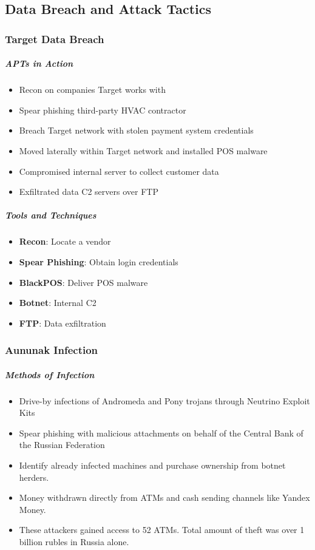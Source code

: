 \subsection{Data Breach and Attack Tactics}
\subsubsection{Target Data Breach}
\subparagraph{APTs in Action}
\begin{itemize}
    \item Recon on companies Target works with
    \item Spear phishing third-party HVAC contractor
    \item Breach Target network with stolen payment system credentials
    \item Moved laterally within Target network and installed POS malware
    \item Compromised internal server to collect customer data
    \item Exfiltrated data C2 servers over FTP
\end{itemize}

\subparagraph{Tools and Techniques}
\begin{itemize}
    \item \textbf{Recon}: Locate a vendor
    \item \textbf{Spear Phishing}: Obtain login credentials
    \item \textbf{BlackPOS}: Deliver POS malware
    \item \textbf{Botnet}: Internal C2
    \item \textbf{FTP}: Data exfiltration
\end{itemize}

\subsubsection{Aununak Infection}
\subparagraph{Methods of Infection}
\begin{itemize}
    \item Drive-by infections of Andromeda and Pony trojans through Neutrino Exploit Kits
    \item Spear phishing with malicious attachments on behalf of the Central Bank of the Russian Federation
    \item Identify already infected machines and purchase ownership from botnet herders.
    \item Money withdrawn directly from ATMs and cash sending channels like Yandex Money.
    \item These attackers gained access to 52 ATMs. Total amount of theft was over 1 billion rubles in Russia alone.
\end{itemize}

